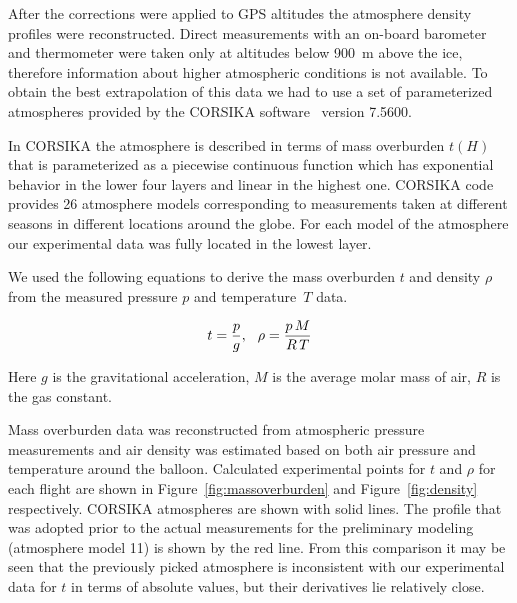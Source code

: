 \documentclass[universe,article,submit,moreauthors,pdftex]{Definitions/mdpi}
\begin{document}
After the corrections were applied to GPS altitudes the atmosphere density profiles were reconstructed. Direct measurements with an on-board barometer and thermometer were taken only at altitudes below 900~m above the ice, therefore information about higher atmospheric conditions is not available. To obtain the best extrapolation of this data we had to use a set of parameterized atmospheres provided by the CORSIKA software~\cite{hec98} version 7.5600.

In CORSIKA the atmosphere is described in terms of mass overburden $t(H)$ that is parameterized as a piecewise continuous function which has exponential behavior in the lower four layers and linear in the highest one. CORSIKA code provides 26 atmosphere models corresponding to measurements taken at different seasons in different locations around the globe. For each model of the atmosphere our experimental data was fully located in the lowest layer.

We used the following equations to derive the mass overburden $t$ and density $\rho$ from the measured pressure $p$ and temperature~$T$ data.

\begin{equation}
t     = \frac{p}{g}, \\ \hspace{7pt}
\rho  = \frac{p \, M}{R \, T} \\
\end{equation}


Here $g$ is the gravitational acceleration, $M$ is the average molar mass of air, $R$ is the gas constant.

Mass overburden data was reconstructed from atmospheric pressure measurements and air density was estimated based on both air pressure and temperature around the balloon. Calculated experimental points for $t$ and $\rho$ for each flight are shown in Figure~\ref{fig:massoverburden} and Figure~\ref{fig:density} respectively. CORSIKA atmospheres are shown with solid lines. The profile that was adopted prior to the actual measurements for the preliminary modeling (atmosphere model 11) is shown by the red line. From this comparison it may be seen that the previously picked atmosphere is inconsistent with our experimental data for $t$ in terms of absolute values, but their derivatives lie relatively close. 
\end{document}
